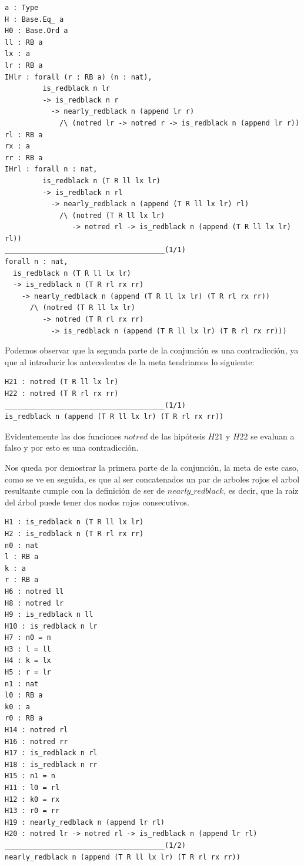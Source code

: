 \documentclass[8pt,leqno,pdflatex,spanish]{book}
\theoremstyle{plain}
\theoremstyle{definition}
\theoremstyle{remark}
\begin{document}
\begin{verbatim}
a : Type
H : Base.Eq_ a
H0 : Base.Ord a
ll : RB a
lx : a
lr : RB a
IHlr : forall (r : RB a) (n : nat),
         is_redblack n lr
         -> is_redblack n r
           -> nearly_redblack n (append lr r)
             /\ (notred lr -> notred r -> is_redblack n (append lr r))
rl : RB a
rx : a
rr : RB a
IHrl : forall n : nat,
         is_redblack n (T R ll lx lr)
         -> is_redblack n rl
           -> nearly_redblack n (append (T R ll lx lr) rl)
             /\ (notred (T R ll lx lr)
                -> notred rl -> is_redblack n (append (T R ll lx lr) rl))
______________________________________(1/1)
forall n : nat,
  is_redblack n (T R ll lx lr)
  -> is_redblack n (T R rl rx rr)
    -> nearly_redblack n (append (T R ll lx lr) (T R rl rx rr))
      /\ (notred (T R ll lx lr)
         -> notred (T R rl rx rr)
           -> is_redblack n (append (T R ll lx lr) (T R rl rx rr)))
\end{verbatim}

Podemos observar que la segunda parte de la conjunci\'on es una contradicci\'on, ya que al 
introducir los antecedentes de la meta tendriamos lo siguiente:

\begin{verbatim}
H21 : notred (T R ll lx lr)
H22 : notred (T R rl rx rr)
______________________________________(1/1)
is_redblack n (append (T R ll lx lr) (T R rl rx rr))
\end{verbatim}

Evidentemente las dos funciones $notred$ de las hip\'otesis $H21$ y $H22$ se evaluan a falso y por 
esto es una contradicci\'on.

Nos queda por demostrar la primera parte de la conjunci\'on, la meta de este caso, como se ve en 
seguida, es que al ser concatenados un par de arboles rojos el arbol resultante cumple con la 
definici\'on de ser de $nearly\_redblack$, es decir, que la raiz del \'arbol puede tener dos nodos 
rojos consecutivos.

\begin{verbatim}
H1 : is_redblack n (T R ll lx lr)
H2 : is_redblack n (T R rl rx rr)
n0 : nat
l : RB a
k : a
r : RB a
H6 : notred ll
H8 : notred lr
H9 : is_redblack n ll
H10 : is_redblack n lr
H7 : n0 = n
H3 : l = ll
H4 : k = lx
H5 : r = lr
n1 : nat
l0 : RB a
k0 : a
r0 : RB a
H14 : notred rl
H16 : notred rr
H17 : is_redblack n rl
H18 : is_redblack n rr
H15 : n1 = n
H11 : l0 = rl
H12 : k0 = rx
H13 : r0 = rr
H19 : nearly_redblack n (append lr rl)
H20 : notred lr -> notred rl -> is_redblack n (append lr rl)
______________________________________(1/2)
nearly_redblack n (append (T R ll lx lr) (T R rl rx rr))
\end{verbatim}
\end{document}
